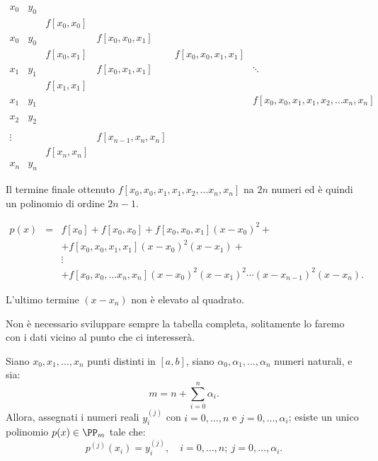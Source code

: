 $\begin{array}{llllll}
x_0 & y_0   &   \\
    &     & f[x_0,x_0] \\
x_0 & y_0  &            & f[x_0,x_0,x_1]  \\
    &     & f[x_0,x_1] &               & f[x_0,x_0,x_1,x_1]\\
x_1 & y_1 &            & f[x_0,x_1,x_1] &                  & \ddots \\
    &     & f[x_1,x_1]\\
x_1 & y_1 &            & & & f[x_0,x_0,x_1,x_1,x_2, \ldots x_n,x_n]\\
    &     & \\
x_2 & y_2 & \\
    &     &          &                    & \\
\vdots & &           & f[x_{n-1}, x_n, x_n]\\
    &    & f[x_n,x_n]\\
x_n & y_n 
\end{array}$
\begin{flushleft}
Il termine finale ottenuto $f[x_0,x_0,x_1,x_1,x_2, \ldots x_n,x_n]$ na
$2n$ numeri ed è quindi un polinomio di ordine $2n-1$.
\end{flushleft}
\[
\begin{array}{lcl}
p(x) & = & f[x_0] + f[x_0,x_0] + f[x_0,x_0,x_1](x-x_0)^2 +\\
     &   & + f[x_0,x_0,x_1,x_1](x-x_0)^2(x-x_1) + \\
     &  & \vdots\\
     &   &+ f[x_0,x_0, \ldots x_n,x_n](x-x_0)^2(x-x_1)^2\cdots 
(x-x_{n-1})^2 (x-x_n).
\end{array}
\]
\begin{notabene}
L'ultimo termine $(x-x_n)$ non è elevato al quadrato.
\end{notabene}

\begin{osse}
Non è necessario sviluppare sempre la tabella completa, solitamente lo
faremo con i dati vicino al punto che ci interesserà.
\end{osse}

\begin{prop}
Siano $x_0, x_1, \ldots, x_n$ punti distinti in $[a,b]$, siano $\alpha_0,
\alpha_1, \ldots, \alpha_n$ numeri naturali, e sia:
\[m = n + \sum_{i=0}^n\alpha_i.\]
Allora, assegnati i numeri reali $y^{(j)}_i$ con $i = 0, \ldots, n$ e $j = 0,
\ldots, \alpha_i$; esiste un unico polinomio $p(x) \in \PP_m$ tale che:
\[
p^{(j)}(x_i) = y^{(j)}_i, \quad i = 0, \ldots, n; \ j= 0, \ldots, \alpha_i.
\]
\end{prop}

